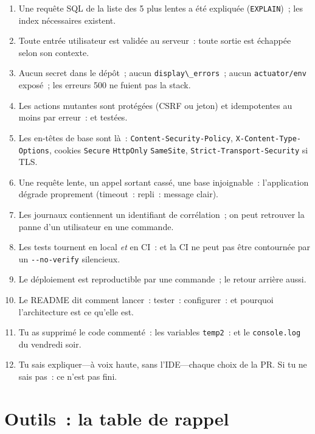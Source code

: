 \documentclass[12pt,a4paper,twoside,openright]{book}
\begin{document}
\begin{enumerate}
  \item[] Une requ\^ete SQL de la liste des 5 plus lentes a \'et\'e expliqu\'ee (\verb|EXPLAIN|)~; les index n\'ecessaires existent.
  \item[] Toute entr\'ee utilisateur est valid\'ee au serveur~: toute sortie est \'echapp\'ee selon son contexte.
  \item[] Aucun secret dans le d\'ep\^ot~; aucun \verb|display\_errors|~; aucun \verb|actuator/env| expos\'e~; les erreurs 500 ne fuient pas la stack.
  \item[] Les actions mutantes sont prot\'eg\'ees (CSRF ou jeton) et idempotentes au moins par erreur~: et test\'ees.
  \item[] Les en-t\^etes de base sont l\`a~: \verb|Content-Security-Policy|, \verb|X-Content-Type-Options|, cookies \verb|Secure| \verb|HttpOnly| \verb|SameSite|, \verb|Strict-Transport-Security| si TLS.
  \item[] Une requ\^ete lente, un appel sortant cass\'e, une base injoignable~: l'application d\'egrade proprement (timeout~: repli~: message clair).
  \item[] Les journaux contiennent un identifiant de corr\'elation~; on peut retrouver la panne d'un utilisateur en une commande.
  \item[] Les tests tournent en local \emph{et} en CI~: et la CI ne peut pas \^etre contourn\'ee par un \verb|--no-verify| silencieux.
  \item[] Le d\'eploiement est reproductible par une commande~; le retour arri\`ere aussi.
  \item[] Le README dit comment lancer~: tester~: configurer~: et pourquoi l'architecture est ce qu'elle est.
  \item[] Tu as supprim\'e le code comment\'e~: les variables \verb|temp2|~: et le \verb|console.log| du vendredi soir.
  \item[] Tu sais expliquer---\`a voix haute, sans l'IDE---chaque choix de la PR. Si tu ne sais pas~: ce n'est pas fini.
\end{enumerate}

\section{Outils~: la table de rappel}
\end{document}
